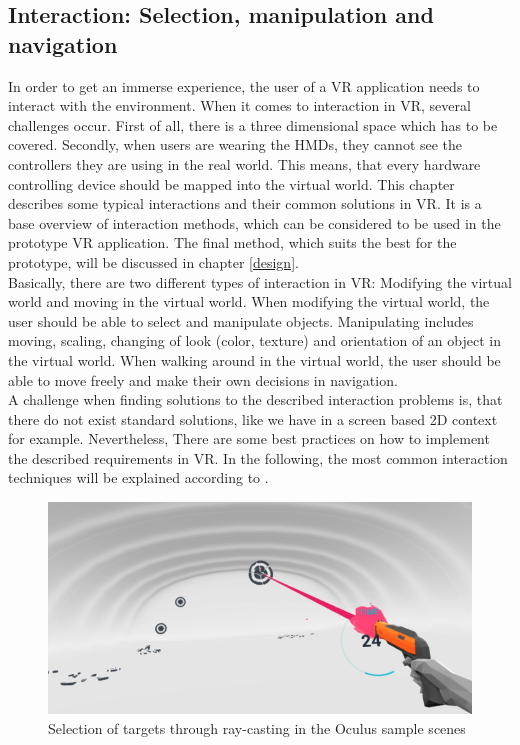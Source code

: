 \subsection{Interaction: Selection, manipulation and navigation}
In order to get an immerse experience, the user of a VR application needs to interact with the environment. When it comes to interaction in VR, several challenges occur. First of all, there is a three dimensional space which has to be covered. Secondly, when users are wearing the HMDs, they cannot see the controllers they are using in the real world. This means, that every hardware controlling device should be mapped into the virtual world. This chapter describes some typical interactions and their common solutions in VR. It is a base overview of interaction methods, which can be considered to be used in the prototype VR application. The final method, which suits the best for the prototype, will be discussed in chapter \ref{design}.\\
Basically, there are two different types of interaction in VR: Modifying the virtual world and moving in the virtual world. When modifying the virtual world, the user should be able to select and manipulate objects. Manipulating includes moving, scaling, changing of look (color, texture) and orientation of an object in the virtual world. When walking around in the virtual world, the user should be able to move freely and make their own decisions in navigation. \cite{Dorner.2013}\\
A challenge when finding solutions to the described interaction problems is, that there do not exist standard solutions, like we have in a screen based 2D context for example. Nevertheless, There are some best practices on how to implement the described requirements in VR. In the following, the most common interaction techniques will be explained according to \cite{Dorner.2013}.

\begin{figure}[h!]
  \includegraphics[width=14cm]{kapitel/ray-casting.jpg}
  \centering
  \caption{Selection of targets through ray-casting in the Oculus sample scenes \cite{https://blogs.unity3d.com/2015/12/09/get-started-with-vr-sample-pack-learning-articles/}}
  \label{fig:ray-casting}
\end{figure}

